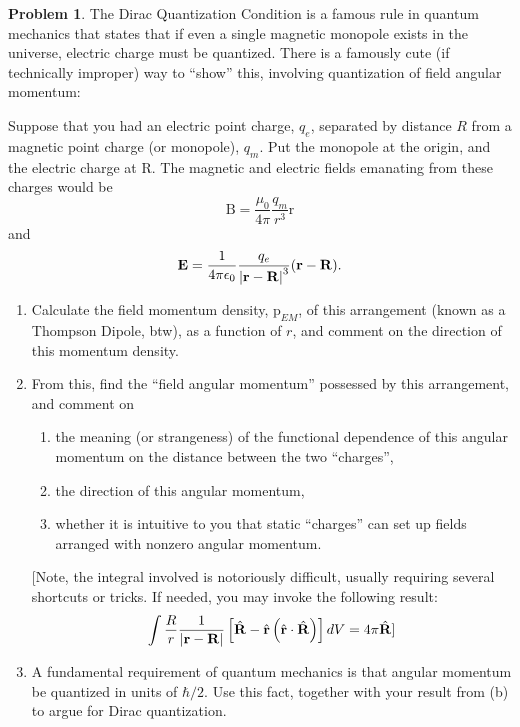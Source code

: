 \documentclass[10pt]{article}
\theoremstyle{definition}
\newtheorem{problem}{Problem}
\newcommand{\uv}[1]{\hat{\bv{{#1}}}}
\newcommand{\bv}[1]{\bm{\mathrm{#1}}}
\begin{document}
\begin{problem}
The Dirac Quantization Condition is a famous rule in quantum mechanics that states
that if even a single magnetic monopole exists in the universe, electric charge must
be quantized. There is a famously cute (if technically improper) way to “show” this,
involving quantization of field angular momentum:


Suppose that you had an electric point charge, $q_e$, separated by distance $R$ from a
magnetic point charge (or monopole), $q_m$. Put the monopole at the origin, and the
electric charge at $\bv{R}$. The magnetic and electric fields emanating from these charges
would be
$$\bv{B}=\frac{\mu_0}{4\pi}\frac{q_m}{r^3}\bv{r}$$
and
$$\bv{E}=\frac{1}{4\pi\epsilon_0}\frac{q_e}{\abs{\bv{r}-\bv{R}}^3}(\bv{r}-\bv{R}).$$
\begin{enumerate}[label=(\alph*)]
  \item Calculate the field momentum density, $\bv{p}_{EM}$, of this arrangement (known as a
        Thompson Dipole, btw), as a function of $r$, and comment on the direction of this
        momentum density.
  \item From this, find the ``field angular momentum'' possessed by this arrangement, and
        comment on
        \begin{enumerate}[label=\roman*.]
          \item the meaning (or strangeness) of the functional dependence of this angular
                momentum on the distance between the two “charges”,
          \item the direction of this angular momentum,
          \item whether it is intuitive to you that static “charges” can set up fields arranged with
                nonzero angular momentum.
        \end{enumerate}
        [Note, the integral involved is notoriously difficult, usually requiring several
        shortcuts or tricks. If needed, you may invoke the following result:
        $$\int\frac{R}{r}\frac{1}{\abs{\bv{r}-\bv{R}}}\left[\uv{R}-\uv{r}\left(\uv{r}\cdot\uv{R}\right)\right]dV=4\pi \uv{R}]$$
  \item A fundamental requirement of quantum mechanics is that angular momentum be
        quantized in units of $\hbar/2$. Use this fact, together with your result from (b) to argue for
        Dirac quantization.
\end{enumerate}
\end{problem}
\end{document}
